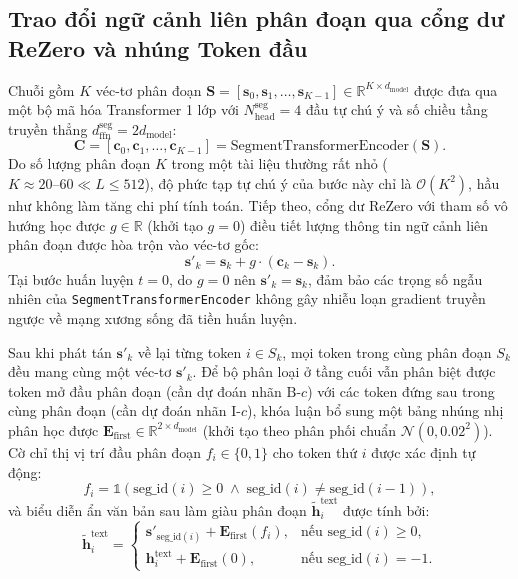\subsection{Trao đổi ngữ cảnh liên phân đoạn qua cổng dư ReZero và nhúng Token đầu}
Chuỗi gồm $K$ véc-tơ phân đoạn $\mathbf{S} = [\mathbf{s}_0, \mathbf{s}_1, \dots, \mathbf{s}_{K-1}] \in \mathbb{R}^{K \times d_{\text{model}}}$ được đưa qua một bộ mã hóa Transformer 1 lớp với $N_{\text{head}}^{\text{seg}} = 4$ đầu tự chú ý và số chiều tầng truyền thẳng $d_{\text{ffn}}^{\text{seg}} = 2 d_{\text{model}}$:
\begin{equation}
    \label{eq:seg_transformer_ch3}
    \mathbf{C} = [\mathbf{c}_0, \mathbf{c}_1, \dots, \mathbf{c}_{K-1}] = \text{SegmentTransformerEncoder}(\mathbf{S}).
\end{equation}
Do số lượng phân đoạn $K$ trong một tài liệu thường rất nhỏ ($K \approx 20\text{--}60 \ll L \le 512$), độ phức tạp tự chú ý của bước này chỉ là $\mathcal{O}(K^2)$, hầu như không làm tăng chi phí tính toán. Tiếp theo, cổng dư ReZero \cite{bachlechner2021rezero} với tham số vô hướng học được $g \in \mathbb{R}$ (khởi tạo $g = 0$) điều tiết lượng thông tin ngữ cảnh liên phân đoạn được hòa trộn vào véc-tơ gốc:
\begin{equation}
    \label{eq:rezero_blend_ch3}
    \mathbf{s}'_k = \mathbf{s}_k + g \cdot (\mathbf{c}_k - \mathbf{s}_k).
\end{equation}
Tại bước huấn luyện $t = 0$, do $g = 0$ nên $\mathbf{s}'_k = \mathbf{s}_k$, đảm bảo các trọng số ngẫu nhiên của \texttt{SegmentTransformerEncoder} không gây nhiễu loạn gradient truyền ngược về mạng xương sống đã tiền huấn luyện.

Sau khi phát tán $\mathbf{s}'_k$ về lại từng token $i \in S_k$, mọi token trong cùng phân đoạn $S_k$ đều mang cùng một véc-tơ $\mathbf{s}'_k$. Để bộ phân loại ở tầng cuối vẫn phân biệt được token mở đầu phân đoạn (cần dự đoán nhãn $\text{B-}c$) với các token đứng sau trong cùng phân đoạn (cần dự đoán nhãn $\text{I-}c$), khóa luận bổ sung một bảng nhúng nhị phân học được $\mathbf{E}_{\text{first}} \in \mathbb{R}^{2 \times d_{\text{model}}}$ (khởi tạo theo phân phối chuẩn $\mathcal{N}(0, 0.02^2)$). Cờ chỉ thị vị trí đầu phân đoạn $f_i \in \{0, 1\}$ cho token thứ $i$ được xác định tự động:
\begin{equation}
    \label{eq:is_first_flag}
    f_i = \mathds{1}\!\left(\text{seg\_id}(i) \ge 0 \;\land\; \text{seg\_id}(i) \neq \text{seg\_id}(i-1)\right),
\end{equation}
và biểu diễn ẩn văn bản sau làm giàu phân đoạn $\tilde{\mathbf{h}}_i^{\text{text}}$ được tính bởi:
\begin{equation}
    \label{eq:broadcast_with_first}
    \tilde{\mathbf{h}}_i^{\text{text}} = \begin{cases}
        \mathbf{s}'_{\text{seg\_id}(i)} + \mathbf{E}_{\text{first}}(f_i), & \text{nếu } \text{seg\_id}(i) \ge 0, \\
        \mathbf{h}_i^{\text{text}} + \mathbf{E}_{\text{first}}(0), & \text{nếu } \text{seg\_id}(i) = -1.
    \end{cases}
\end{equation}

